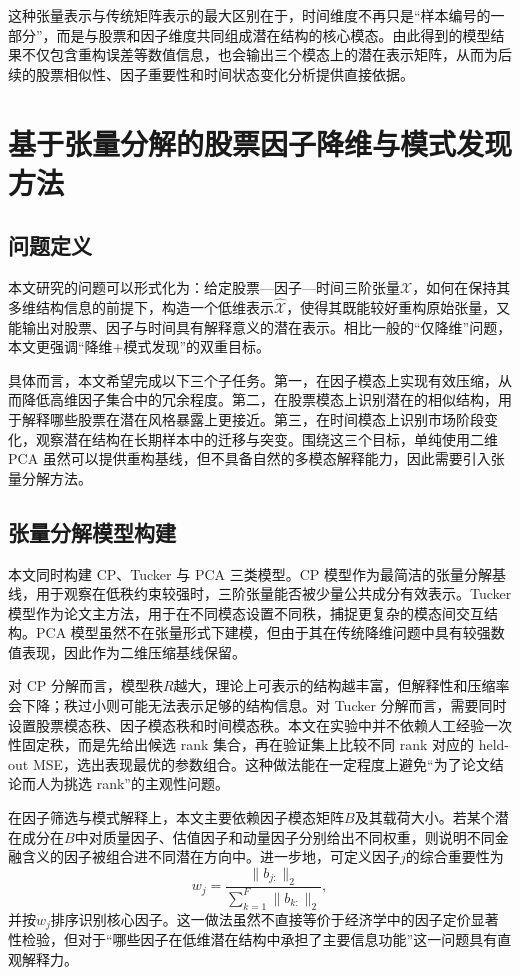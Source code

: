 这种张量表示与传统矩阵表示的最大区别在于，时间维度不再只是“样本编号的一部分”，而是与股票和因子维度共同组成潜在结构的核心模态。由此得到的模型结果不仅包含重构误差等数值信息，也会输出三个模态上的潜在表示矩阵，从而为后续的股票相似性、因子重要性和时间状态变化分析提供直接依据。

\chapter{基于张量分解的股票因子降维与模式发现方法}

\section{问题定义}

本文研究的问题可以形式化为：给定股票—因子—时间三阶张量$\mathcal{X}$，如何在保持其多维结构信息的前提下，构造一个低维表示$\hat{\mathcal{X}}$，使得其既能较好重构原始张量，又能输出对股票、因子与时间具有解释意义的潜在表示。相比一般的“仅降维”问题，本文更强调“降维+模式发现”的双重目标。

具体而言，本文希望完成以下三个子任务。第一，在因子模态上实现有效压缩，从而降低高维因子集合中的冗余程度。第二，在股票模态上识别潜在的相似结构，用于解释哪些股票在潜在风格暴露上更接近。第三，在时间模态上识别市场阶段变化，观察潜在结构在长期样本中的迁移与突变。围绕这三个目标，单纯使用二维 PCA 虽然可以提供重构基线，但不具备自然的多模态解释能力，因此需要引入张量分解方法。

\section{张量分解模型构建}

本文同时构建 CP、Tucker 与 PCA 三类模型。CP 模型作为最简洁的张量分解基线，用于观察在低秩约束较强时，三阶张量能否被少量公共成分有效表示。Tucker 模型作为论文主方法，用于在不同模态设置不同秩，捕捉更复杂的模态间交互结构。PCA 模型虽然不在张量形式下建模，但由于其在传统降维问题中具有较强数值表现，因此作为二维压缩基线保留。

对 CP 分解而言，模型秩$R$越大，理论上可表示的结构越丰富，但解释性和压缩率会下降；秩过小则可能无法表示足够的结构信息。对 Tucker 分解而言，需要同时设置股票模态秩、因子模态秩和时间模态秩。本文在实验中并不依赖人工经验一次性固定秩，而是先给出候选 rank 集合，再在验证集上比较不同 rank 对应的 held-out MSE，选出表现最优的参数组合。这种做法能在一定程度上避免“为了论文结论而人为挑选 rank”的主观性问题。

在因子筛选与模式解释上，本文主要依赖因子模态矩阵$B$及其载荷大小。若某个潜在成分在$B$中对质量因子、估值因子和动量因子分别给出不同权重，则说明不同金融含义的因子被组合进不同潜在方向中。进一步地，可定义因子$j$的综合重要性为
\begin{equation}
w_j=\frac{\|b_{j:}\|_2}{\sum_{k=1}^{F}\|b_{k:}\|_2},
\end{equation}
并按$w_j$排序识别核心因子。这一做法虽然不直接等价于经济学中的因子定价显著性检验，但对于“哪些因子在低维潜在结构中承担了主要信息功能”这一问题具有直观解释力。

